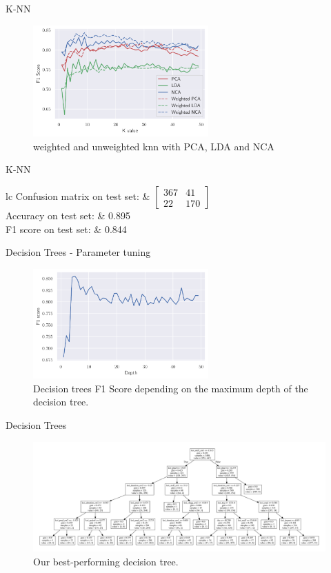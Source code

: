 \documentclass[aspectratio=169]{beamer}
\newcommand{\fresults}[3]{
\begin{table}[H]
\centering
\begin{tabular}{lc}
Confusion matrix on test set: & \( \begin{bmatrix} #1 \end{bmatrix} \) \\
    \addlinespace[0.5em]
    Accuracy on test set: & #2 \\
    F1 score on test set: & #3
\end{tabular}
\end{table}
}
\begin{document}
\begin{frame}{K-NN}
\begin{figure}[H]
    \centering
    \includegraphics[width=0.6\textwidth]{knn}
    \caption{weighted and unweighted knn with PCA, LDA and NCA}%
    \label{fig:knn_pca_lda_nca}
\end{figure}
\end{frame}

\begin{frame}{K-NN}

\fresults{ 367 &  41 \\ 22 & 170 }{0.895}{0.844}

\end{frame}

\begin{frame}{Decision Trees - Parameter tuning}
\begin{figure}[H]
    \centering
    \includegraphics[width=0.6\textwidth]{decision_trees}
    \caption{Decision trees F1 Score depending on the maximum depth of the decision tree.}%
    \label{fig:decision_trees_acc}
\end{figure}
\end{frame}

\begin{frame}{Decision Trees}
\begin{figure}[H]
    \centering
    \includegraphics[width=\textwidth]{decision_tree}
    \caption{Our best-performing decision tree.}%
    \label{fig:decision_trees}
\end{figure}
\end{frame}
\end{document}
